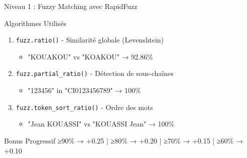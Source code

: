 \documentclass[aspectratio=169]{beamer}
\begin{document}
\begin{frame}{Niveau 1 : Fuzzy Matching avec RapidFuzz}
    \begin{block}{Algorithmes Utilisés}
        \begin{enumerate}
            \item \texttt{fuzz.ratio()} - Similarité globale (Levenshtein)
            \begin{itemize}
                \item "KOUAKOU" vs "KOAKOU" → 92.86\%
            \end{itemize}

            \item \texttt{fuzz.partial\_ratio()} - Détection de sous-chaînes
            \begin{itemize}
                \item "123456" in "CI0123456789" → 100\%
            \end{itemize}

            \item \texttt{fuzz.token\_sort\_ratio()} - Ordre des mots
            \begin{itemize}
                \item "Jean KOUASSI" vs "KOUASSI Jean" → 100\%
            \end{itemize}
        \end{enumerate}
    \end{block}

    \begin{exampleblock}{Bonus Progressif}
        ≥90\% → +0.25 | ≥80\% → +0.20 | ≥70\% → +0.15 | ≥60\% → +0.10
    \end{exampleblock}
\end{frame}
\end{document}
